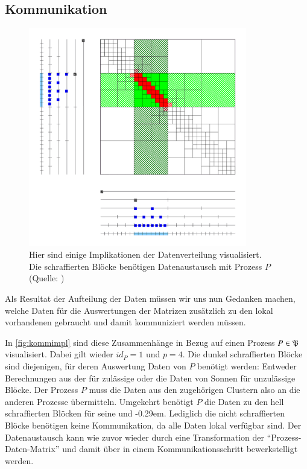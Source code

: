   \subsection{Kommunikation}
  \label{sec:komm}
    \begin{figure}[t]
      \includegraphics[width=0.85\textwidth]{img/kommimpl.png}
      \caption{Hier sind einige Implikationen der Datenverteilung visualisiert.\\
	       Die schraffierten Blöcke benötigen Datenaustausch mit Prozess $P$\\
	       (Quelle: \citet{h2slides})}
      \label{fig:kommimpl}
    \end{figure}

    Als Resultat der Aufteilung der Daten müssen wir uns nun Gedanken machen, welche Daten für die Auswertungen der Matrizen zusätzlich zu den lokal vorhandenen gebraucht und damit kommuniziert werden 
    müssen.
    
    In \autoref{fig:kommimpl} sind diese Zusammenhänge in Bezug auf einen Prozess $P \in \mathfrak{P}$ visualisiert. Dabei gilt wieder $id_P=1$ und $p=4$. Die dunkel schraffierten Blöcke sind diejenigen, 
    für deren Auswertung Daten von $P$ benötigt werden: 
    Entweder Berechnungen aus der \vorw für zulässige oder die Daten von Sonnen für unzulässige Blöcke. Der Prozess $P$ muss die Daten aus den zugehörigen Clustern also an die anderen Prozesse 
    übermitteln. Umgekehrt benötigt $P$ die Daten zu den hell schraffierten Blöcken für seine \koppl und \ruckw \kern-0.29em. Lediglich die nicht schraffierten Blöcke benötigen keine Kommunikation, 
    da alle Daten lokal verfügbar sind. Der Datenaustausch kann wie zuvor wieder durch eine Transformation der ``Prozess-Daten-Matrix'' und damit über  in einem 
    Kommunikationsschritt bewerkstelligt werden. 
    
